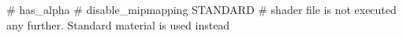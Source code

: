 # has_alpha
# disable_mipmapping
STANDARD     # shader file is not executed any further. Standard material is used instead


